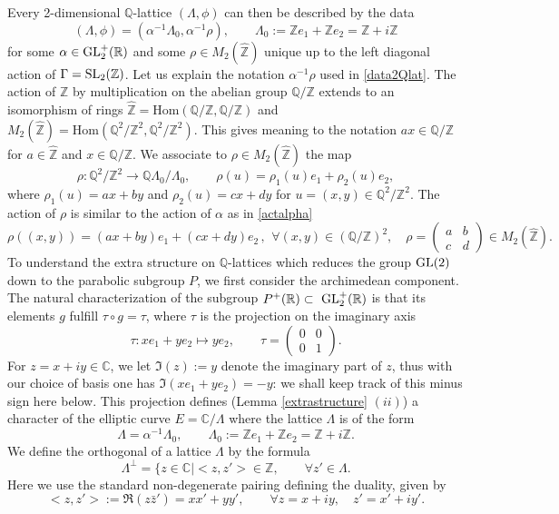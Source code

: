 \documentclass[graybox, envcountsect%
]{svmult}
\def\GL{{\rm GL}}
\def\Hom{{\rm Hom}}
\def\SL{{\rm SL}}
\def\C{{\mathbb C}}
\def\Q{{\mathbb Q}}
\def\R{{\mathbb R}}
\def\Z{{\mathbb Z}}
\def\qqq{\,,\,~\forall}
\def\Hom {{\mbox{Hom}}}
\begin{document}
Every 2-dimensional $\Q$-lattice $(\Lambda,\phi)$ can then be
described by the data 
\begin{equation}\label{data2Qlat}
(\Lambda,\phi)=(\alpha^{-1}\Lambda_0, \alpha^{-1}\rho),  \qquad \Lambda_0:=\Z e_1 + \Z e_2= \Z + i \Z
\end{equation}
for some $\alpha\in\GL_2^+(\R)$ and some $\rho\in M_2(\hat\Z)$ unique up to the left diagonal action of $\Gamma=\SL_2(\Z)$. Let us explain the notation $\alpha^{-1}\rho$ used in \eqref{data2Qlat}. The action of $\Z$ by multiplication on the abelian group $\Q/\Z$ extends to an isomorphism of rings $\hat\Z=\Hom(\Q/\Z,\Q/\Z)$ and  $M_2(\hat\Z)=\Hom(\Q^2/\Z^2,\Q^2/\Z^2)$. This gives meaning to the notation $a x\in \Q/\Z$ for $a\in \hat\Z$ and $x\in \Q/\Z$. 
We associate to $\rho\in
M_2(\hat\Z)$ the map
\begin{equation}\label{rhoLambda0}
\rho :\Q^2/\Z^2 \to \Q\Lambda_0 / \Lambda_0, \qquad  \rho(u)=
\rho_1(u)e_1 +\rho_2(u)e_2,
\end{equation}
where $\rho_1(u)=a x+b y$ and $\rho_2(u)=c x+d y$ for $u=(x,y)\in \Q^2/\Z^2$.
The action of $\rho$ is similar to the action of $\alpha$ as in \eqref{actalpha}
\begin{equation}\label{actrho}
\rho((x,y)) = (a x+ b y) e_1 + (cx+ dy) e_2\qqq (x,y)\in (\Q/\Z)^2,\quad \rho=\begin{pmatrix} a &b \\
c &d \end{pmatrix} \in M_2 (\hat\Z).
\end{equation}
To understand the extra structure on $\Q$-lattices which reduces the group $\GL(2)$ down to the parabolic subgroup $P$, we first consider the archimedean component.
The natural characterization of the subgroup $P^+(\R)\subset\ \GL_2^+(\R)$ is that its elements $g$ fulfill $\tau\circ g=\tau$, where $\tau$ is the projection on the imaginary axis
$$
\tau:x e_1 + y e_2\mapsto y e_2, \qquad \tau=\begin{pmatrix} 0 &0 \\
0 &1 \end{pmatrix}.
$$ 
For $z=x+iy\in \C$, we let  $\Im(z):=y$ denote the imaginary part of $z$, thus with our choice of basis one has $\Im(xe_1+ye_2)=-y$:  we shall keep track of this minus sign here below. This projection defines (Lemma \ref{extrastructure} $(ii)$) a	character 
of the elliptic curve $E=\C/\Lambda$ where the lattice $\Lambda$ is of the form 
\begin{equation}\label{Lambda0}
\Lambda=\alpha^{-1}\Lambda_0, \qquad \Lambda_0:=\Z e_1 + \Z e_2= \Z + i \Z.
\end{equation}
We define the orthogonal of a lattice $\Lambda$ by the formula
$$
\Lambda^\perp=\{z\in\C\mid <z,z'>\in \Z,\qquad \forall z'\in \Lambda.
$$
Here we use the standard non-degenerate pairing defining the duality, given by 
 $$
 <z,z'>:=\Re(z\bar z')=xx'+yy',\qquad \forall z=x+iy, \quad z'=x'+iy'.
 $$
 
\end{document}
